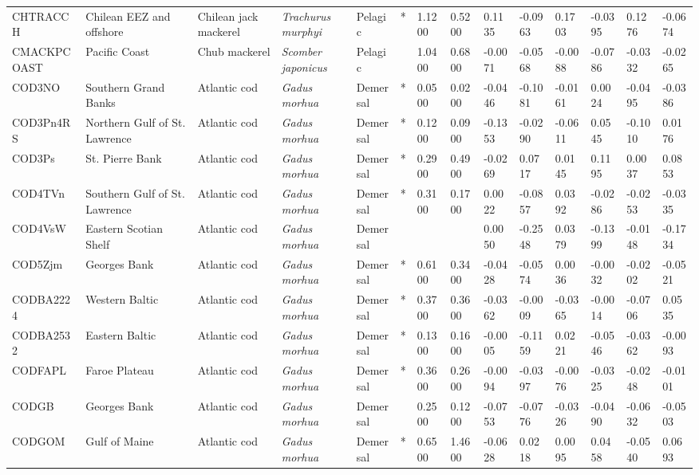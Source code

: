 \begin{longtable}{p{2.6cm}p{1.9cm}p{1.7cm}p{1.6cm}p{1cm}p{0.3cm}p{1cm}p{1cm}p{1cm}p{1.1cm}p{1cm}p{1.1cm}p{1cm}p{1.1cm}}
  CHTRACCH & Chilean EEZ and offshore & Chilean jack mackerel & \textit{Trachurus murphyi} & Pelagic & * & 1.1200 & 0.5200 & 0.1135 & -0.0963 & 0.1703 & -0.0395 & 0.1276 & -0.0674 \\ 
  CMACKPCOAST & Pacific Coast & Chub mackerel & \textit{Scomber japonicus} & Pelagic &   & 1.0400 & 0.6800 & -0.0071 & -0.0568 & -0.0088 & -0.0786 & -0.0332 & -0.0265 \\ 
  COD3NO & Southern Grand Banks & Atlantic cod & \textit{Gadus morhua} & Demersal & * & 0.0500 & 0.0200 & -0.0446 & -0.1081 & -0.0161 & 0.0024 & -0.0495 & -0.0386 \\ 
  COD3Pn4RS & Northern Gulf of St. Lawrence & Atlantic cod & \textit{Gadus morhua} & Demersal & * & 0.1200 & 0.0900 & -0.1353 & -0.0290 & -0.0611 & 0.0545 & -0.1010 & 0.0176 \\ 
  COD3Ps & St. Pierre Bank & Atlantic cod & \textit{Gadus morhua} & Demersal & * & 0.2900 & 0.4900 & -0.0269 & 0.0717 & 0.0145 & 0.1195 & 0.0037 & 0.0853 \\ 
  COD4TVn & Southern Gulf of St. Lawrence & Atlantic cod & \textit{Gadus morhua} & Demersal & * & 0.3100 & 0.1700 & 0.0022 & -0.0857 & 0.0392 & -0.0286 & -0.0253 & -0.0335 \\ 
  COD4VsW & Eastern Scotian Shelf & Atlantic cod & \textit{Gadus morhua} & Demersal &  &  &  & 0.0050 & -0.2548 & 0.0379 & -0.1399 & -0.0148 & -0.1734 \\ 
  COD5Zjm & Georges Bank & Atlantic cod & \textit{Gadus morhua} & Demersal & * & 0.6100 & 0.3400 & -0.0428 & -0.0574 & 0.0036 & -0.0032 & -0.0202 & -0.0521 \\ 
  CODBA2224 & Western Baltic & Atlantic cod & \textit{Gadus morhua} & Demersal & * & 0.3700 & 0.3600 & -0.0362 & -0.0009 & -0.0365 & -0.0014 & -0.0706 & 0.0535 \\ 
  CODBA2532 & Eastern Baltic & Atlantic cod & \textit{Gadus morhua} & Demersal & * & 0.1300 & 0.1600 & -0.0005 & -0.1159 & 0.0221 & -0.0546 & -0.0362 & -0.0093 \\ 
  CODFAPL & Faroe Plateau & Atlantic cod & \textit{Gadus morhua} & Demersal & * & 0.3600 & 0.2600 & -0.0094 & -0.0397 & -0.0076 & -0.0325 & -0.0248 & -0.0101 \\ 
  CODGB & Georges Bank & Atlantic cod & \textit{Gadus morhua} & Demersal &   & 0.2500 & 0.1200 & -0.0753 & -0.0776 & -0.0326 & -0.0490 & -0.0632 & -0.0503 \\ 
  CODGOM & Gulf of Maine & Atlantic cod & \textit{Gadus morhua} & Demersal & * & 0.6500 & 1.4600 & -0.0628 & 0.0218 & 0.0095 & 0.0458 & -0.0540 & 0.0693 \\ 

\end{longtable}

